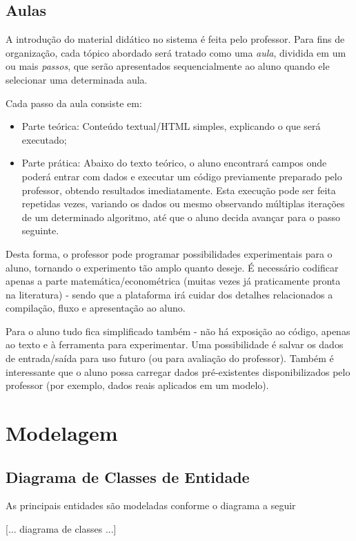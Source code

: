 \documentclass{abnt}
\begin{document}
\subsection{Aulas}
A introdução do material didático no sistema é feita pelo professor. Para fins de organização, cada tópico abordado será tratado como uma \textit{aula}, dividida em um ou mais \textit{passos}, que serão apresentados sequencialmente ao aluno quando ele selecionar uma determinada aula.

Cada passo da aula consiste em:
\begin{itemize}
\item Parte teórica: Conteúdo textual/HTML simples, explicando o que será executado; 
\item Parte prática: Abaixo do texto teórico, o aluno encontrará campos onde poderá entrar com dados e executar um código previamente preparado pelo professor, obtendo resultados imediatamente. Esta execução pode ser feita repetidas vezes, variando os dados ou mesmo observando múltiplas iterações de um determinado algoritmo, até que o aluno decida avançar para o passo seguinte.
\end{itemize}

Desta forma, o professor pode programar possibilidades experimentais para o aluno, tornando o experimento tão amplo quanto deseje. É necessário codificar apenas a parte matemática/econométrica (muitas vezes já praticamente pronta na literatura) - sendo que a plataforma irá cuidar dos detalhes relacionados a compilação, fluxo e apresentação ao aluno.

Para o aluno tudo fica simplificado também - não há exposição ao código, apenas ao texto e à ferramenta para experimentar. Uma possibilidade é salvar os dados de entrada/saída para uso futuro (ou para avaliação do professor). Também é interessante que o aluno possa carregar dados pré-existentes disponibilizados pelo professor (por exemplo, dados reais aplicados em um modelo).


\section {Modelagem}

\subsection{Diagrama de Classes de Entidade}
As principais entidades são modeladas conforme o diagrama a seguir

[... diagrama de classes ...]
\end{document}
